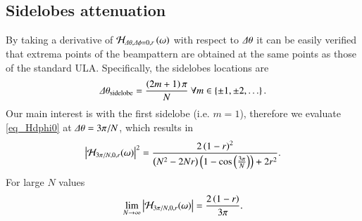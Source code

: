 \subsection*{Sidelobes attenuation}
\ifdefined\showDev
\else
\fi
By taking a derivative of $\mathcal{H}_{\Delta\theta,\Delta\phi=0,r}\left({\omega}\right)$  with respect to $\Delta\theta$ it can be easily verified that extrema points of the beampattern are obtained at the same points as those of the standard ULA. Specifically, the sidelobes locations are
\begin{equation}
    \label{eqn_CB_sidelobesLocations}
    \dTheta_{\text{sidelobe}} = \frac{\rBrace{2m+1}\pi}{N}\ \forall m\in\cBrace{\pm 1,\pm 2,\hdots}.
\end{equation}
Our main interest is with the first sidelobe (i.e. $m=1$), therefore we evaluate \eqref{eq_Hdphi0} at $\Delta\theta = 3\pi/N$, which results in
\begin{equation}
    \abs{\Hr_{{3\pi}/{N},0,r}(\omega)}^2
    =
    \frac{
    2\rBrace{1-r}^{2}
    }{
    \rBrace{N^{2}-2Nr}\rBrace{1-\cos{\rBrace{\frac{3\pi}{N}}}}+2r^{2}
    }.
    \label{eq_HSidelobes}
\end{equation}
For large $N$ values 
\begin{equation*}
    \lim_{N\rightarrow\infty}\left\vert\mathcal{H}_{3\pi/N,0,r}(\omega)\right\vert=\frac{
    2\left({1-r}\right)
    }{
    3\pi
    }.
\end{equation*}
